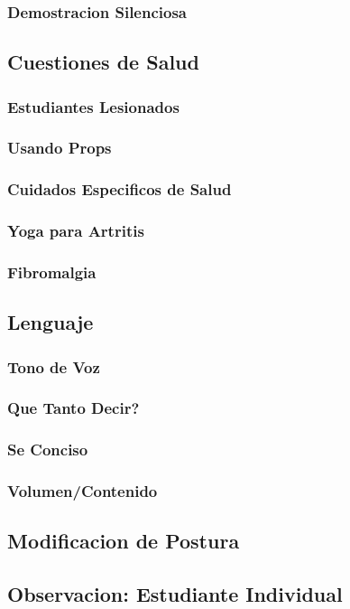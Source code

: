 \documentclass[a4paper]{article}
\begin{document}
\subsubsection{Demostracion Silenciosa}
\subsection{Cuestiones de Salud}
\subsubsection{Estudiantes Lesionados}
\subsubsection{Usando Props}
\subsubsection{Cuidados Especificos de Salud}
\subsubsection{Yoga para Artritis}
\subsubsection{Fibromalgia}
\subsection{Lenguaje}
\subsubsection{Tono de Voz}
\subsubsection{Que Tanto Decir?}
\subsubsection{Se Conciso}
\subsubsection{Volumen/Contenido}
\subsection{Modificacion de Postura}
\subsection{Observacion: Estudiante Individual}
\end{document}
